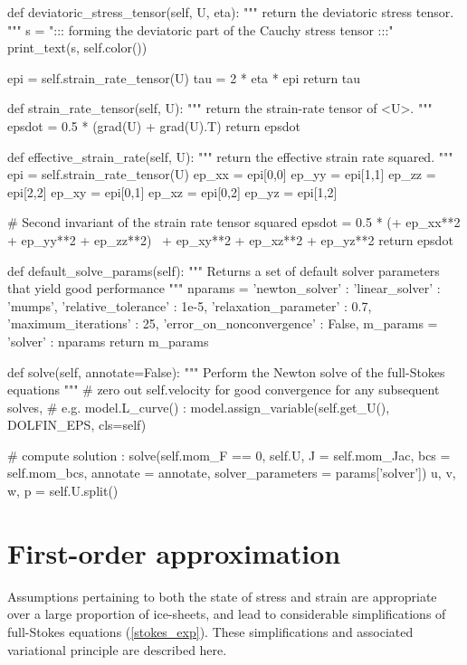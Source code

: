 \begin{python}[label=cslvr_full_stokes, caption={\CSLVR source code contained in the \texttt{MomentumDukowiczStokes} class.}]
def deviatoric_stress_tensor(self, U, eta):
  """
  return the deviatoric stress tensor.
  """
  s   = "::: forming the deviatoric part of the Cauchy stress tensor :::"
  print_text(s, self.color())

  epi = self.strain_rate_tensor(U)
  tau = 2 * eta * epi
  return tau

def strain_rate_tensor(self, U):
  """
  return the strain-rate tensor of <U>.
  """
  epsdot = 0.5 * (grad(U) + grad(U).T)
  return epsdot

def effective_strain_rate(self, U):
  """
  return the effective strain rate squared.
  """
  epi    = self.strain_rate_tensor(U)
  ep_xx  = epi[0,0]
  ep_yy  = epi[1,1]
  ep_zz  = epi[2,2]
  ep_xy  = epi[0,1]
  ep_xz  = epi[0,2]
  ep_yz  = epi[1,2]
  
  # Second invariant of the strain rate tensor squared
  epsdot = 0.5 * (+ ep_xx**2 + ep_yy**2 + ep_zz**2) \
                  + ep_xy**2 + ep_xz**2 + ep_yz**2
  return epsdot

def default_solve_params(self):
  """ 
  Returns a set of default solver parameters that yield good performance
  """
  nparams = {'newton_solver' :
            {
              'linear_solver'            : 'mumps',
              'relative_tolerance'       : 1e-5,
              'relaxation_parameter'     : 0.7,
              'maximum_iterations'       : 25,
              'error_on_nonconvergence'  : False,
            }}
  m_params  = {'solver'      : nparams}
  return m_params

def solve(self, annotate=False):
  """ 
  Perform the Newton solve of the full-Stokes equations 
  """
  # zero out self.velocity for good convergence for any subsequent solves,
  # e.g. model.L_curve() :
  model.assign_variable(self.get_U(), DOLFIN_EPS, cls=self)
  
  # compute solution :
  solve(self.mom_F == 0, self.U, J = self.mom_Jac, bcs = self.mom_bcs,
        annotate = annotate, solver_parameters = params['solver'])
  u, v, w, p = self.U.split()
  
\end{python}

\section{First-order approximation} \label{ssn_first_order}

Assumptions pertaining to both the state of stress and strain are appropriate over a large proportion of ice-sheets, and lead to considerable simplifications of full-Stokes equations (\ref{stokes_exp}).  These simplifications and associated variational principle are described here.

